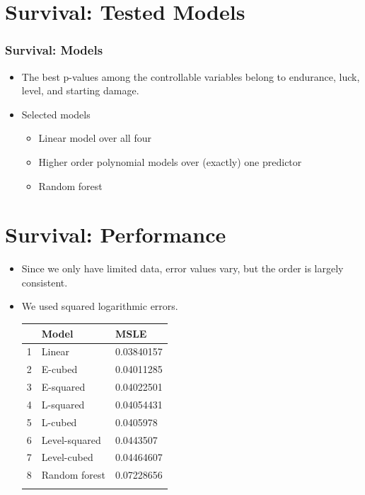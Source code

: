 \documentclass{beamer}
\begin{document}
\section{Survival: Tested Models}
\begin{frame}
  \frametitle{Survival: Models}
  \begin{itemize}
  \item The best p-values among the controllable variables belong to endurance, luck, level, and starting damage.
  \item Selected models
    \begin{itemize}
    \item Linear model over all four
    \item Higher order polynomial models over (exactly) one predictor
    \item Random forest
    \end{itemize}
  \end{itemize}
\end{frame}

\section{Survival: Performance}
\begin{frame}
  \begin{itemize}
  \item Since we only have limited data, error values vary, but the order is largely consistent.
  \item We used squared logarithmic errors.
    \begin{table}
      \begin{tabular}{l|ll}
        &\textbf{Model}&\textbf{MSLE}\\\hline
        1 & Linear & 0.03840157 \\
        2 & E-cubed & 0.04011285 \\
        3 & E-squared & 0.04022501 \\
        4 & L-squared & 0.04054431 \\
        5 & L-cubed & 0.0405978 \\
        6 & Level-squared & 0.0443507 \\
        7 & Level-cubed & 0.04464607 \\
        8 & Random forest & 0.07228656 \\
        \hline  &&
      \end{tabular}
  \end{table}
\end{itemize}
\end{frame}
\end{document}
